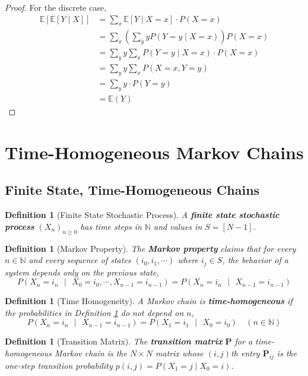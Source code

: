 \documentclass{tufte-handout}
\newtheorem{defn}[thm]{Definition}
\begin{document}
\begin{proof}
  For the discrete case, \begin{align*} \mathbb{E}[\mathbb{E}[Y \mid X]] &=\sum_{x} \mathbb{E}[Y \mid X=x] \cdot P(X=x) \\ &=\sum_{x}\left(\sum_{y} y P(Y=y \mid X=x)\right) P(X=x) \\ &=\sum_{y} y \sum_{x} P(Y=y \mid X=x) \cdot P(X=x) \\ &=\sum_{y} y \sum_{x} P(X=x, Y=y) \\ &=\sum_{y} y \cdot P(Y=y) \\ &=\mathbb{E}(Y) \end{align*}
\end{proof}

\section{Time-Homogeneous Markov Chains}
\subsection{Finite State, Time-Homogeneous Chains}
\begin{defn}[Finite State Stochastic Process]
    A \textbf{finite state stochastic process} $(X_n)_{n \geq 0}$ has time steps in $\mathbb{N}$ and values in $S = [N - 1]$.
  \end{defn}

  \begin{defn}[Markov Property]
    The \textbf{Markov property} claims that for every $n \in \mathbb{N}$ and every sequence of states $(i_0, i_1, \cdots)$ where $i_j \in S$, the behavior of a system depends only on the previous state,
    \[
    P(X_n = i_n \text{ $|$ } X_0 = i_0, \cdots, X_{n-1} = i_{n-1}) = P(X_n = i_n \text{ $|$ } X_{n-1} = i_{n-1})
    \]
  \label{markovprop}
  \end{defn}

  \begin{defn}[Time Homogeneity]
  A Markov chain is \textbf{time-homogeneous} if the probabilities in Definition \ref{markovprop} do not depend on $n$,
  \[
    P(X_n = i_n \text{ $|$ } X_{n-1} = i_{n-1}) = P(X_1 = i_1 \text{ $|$ } X_0 = i_0) \quad (n \in \mathbb{N})
  \]
  \end{defn}

  \begin{defn}[Transition Matrix]
    The \textbf{transition matrix} $\boldsymbol{P}$ for a time-homogeneous Markov chain is the $N \times N$ matrix whose $(i,j)$th entry $\boldsymbol{P}_{ij}$ is the one-step transition probability $p(i,j) = P(X_1 = j \mid X_0 = i)$.
  \end{defn}
\end{document}
